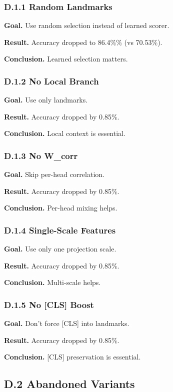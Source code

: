 \subsubsection{D.1.1 Random Landmarks}

\textbf{Goal.} Use random selection instead of learned scorer.

\textbf{Result.} Accuracy dropped to 86.4\%\% (vs 70.53\%).

\textbf{Conclusion.} Learned selection matters.

\subsubsection{D.1.2 No Local Branch}

\textbf{Goal.} Use only landmarks.

\textbf{Result.} Accuracy dropped by 0.85\%.

\textbf{Conclusion.} Local context is essential.

\subsubsection{D.1.3 No W\_corr}

\textbf{Goal.} Skip per-head correlation.

\textbf{Result.} Accuracy dropped by 0.85\%.

\textbf{Conclusion.} Per-head mixing helps.

\subsubsection{D.1.4 Single-Scale Features}

\textbf{Goal.} Use only one projection scale.

\textbf{Result.} Accuracy dropped by 0.85\%.

\textbf{Conclusion.} Multi-scale helps.

\subsubsection{D.1.5 No [CLS] Boost}

\textbf{Goal.} Don't force [CLS] into landmarks.

\textbf{Result.} Accuracy dropped by 0.85\%.

\textbf{Conclusion.} [CLS] preservation is essential.

\subsection{D.2 Abandoned Variants}

